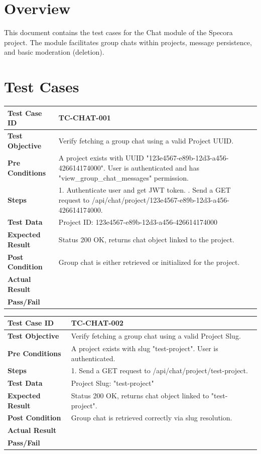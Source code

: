 \section{Overview}
This document contains the test cases for the Chat module of the Specora project. The module facilitates group chats within projects, message persistence, and basic moderation (deletion).

\section{Test Cases}

\begin{longtable}{|p{}|p{}|}
\hline
\textbf{Test Case ID} & TC-CHAT-001 \\ \hline
\textbf{Test Objective} & Verify fetching a group chat using a valid Project UUID. \\ \hline
\textbf{Pre Conditions} & A project exists with UUID "123e4567-e89b-12d3-a456-426614174000". User is authenticated and has "view_group_chat_messages" permission. \\ \hline
\textbf{Steps} & 
1. Authenticate user and get JWT token. \newline
2. Send a GET request to /api/chat/project/123e4567-e89b-12d3-a456-426614174000. \\ \hline
\textbf{Test Data} & Project ID: 123e4567-e89b-12d3-a456-426614174000 \\ \hline
\textbf{Expected Result} & Status 200 OK, returns chat object linked to the project. \\ \hline
\textbf{Post Condition} & Group chat is either retrieved or initialized for the project. \\ \hline
\textbf{Actual Result} &  \\ \hline
\textbf{Pass/Fail} &  \\ \hline
\end{longtable}

\begin{longtable}{|p{}|p{}|}
\hline
\textbf{Test Case ID} & TC-CHAT-002 \\ \hline
\textbf{Test Objective} & Verify fetching a group chat using a valid Project Slug. \\ \hline
\textbf{Pre Conditions} & A project exists with slug "test-project". User is authenticated. \\ \hline
\textbf{Steps} & 
1. Send a GET request to /api/chat/project/test-project. \\ \hline
\textbf{Test Data} & Project Slug: "test-project" \\ \hline
\textbf{Expected Result} & Status 200 OK, returns chat object linked to "test-project". \\ \hline
\textbf{Post Condition} & Group chat is retrieved correctly via slug resolution. \\ \hline
\textbf{Actual Result} &  \\ \hline
\textbf{Pass/Fail} &  \\ \hline
\end{longtable}


